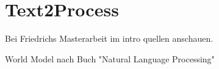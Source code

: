 \section{Text2Process}

Bei Friedrichs Masterarbeit im intro quellen anschauen.  

World Model nach Buch "Natural Language Processing"

